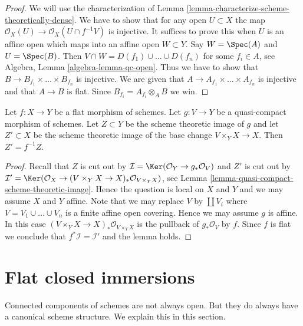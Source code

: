 \begin{proof}
We will use the characterization of
Lemma \ref{lemma-characterize-scheme-theoretically-dense}.
We have to show that for any open $U \subset X$ the map
$\mathcal{O}_X(U) \to \mathcal{O}_X(U \cap f^{-1}V)$ is injective.
It suffices to prove this when $U$ is an affine open which maps into
an affine open $W \subset Y$. Say $W = \Spec(A)$ and $U = \Spec(B)$.
Then $V \cap W = D(f_1) \cup \ldots \cup D(f_n)$ for some
$f_i \in A$, see
Algebra, Lemma \ref{algebra-lemma-qc-open}.
Thus we have to show that
$B \to B_{f_1} \times \ldots \times B_{f_n}$ is injective.
We are given that $A \to A_{f_1} \times \ldots \times A_{f_n}$ is injective
and that $A \to B$ is flat. Since $B_{f_i} = A_{f_i} \otimes_A B$ we win.
\end{proof}

\begin{lemma}
\label{lemma-flat-base-change-scheme-theoretic-image}
Let $f : X \to Y$ be a flat morphism of schemes. Let $g : V \to Y$ be a
quasi-compact morphism of schemes. Let $Z \subset Y$ be the scheme theoretic
image of $g$ and let $Z' \subset X$ be the scheme theoretic image of the
base change $V \times_Y X \to X$. Then $Z' = f^{-1}Z$.
\end{lemma}

\begin{proof}
Recall that $Z$ is cut out by
$\mathcal{I} = \Ker(\mathcal{O}_Y \to g_*\mathcal{O}_V)$
and $Z'$ is cut out by
$\mathcal{I}' = \Ker(\mathcal{O}_X \to
(V \times_Y X \to X)_*\mathcal{O}_{V \times_Y X})$, see
Lemma \ref{lemma-quasi-compact-scheme-theoretic-image}.
Hence the question is local on $X$ and $Y$ and we may assume $X$ and $Y$
affine. Note that we may replace $V$ by $\coprod V_i$ where
$V = V_1 \cup \ldots \cup V_n$ is a finite affine open covering.
Hence we may assume $g$ is affine. In this case
$(V \times_Y X \to X)_*\mathcal{O}_{V \times_Y X}$ is the pullback
of $g_*\mathcal{O}_V$ by $f$. Since $f$ is flat we conclude that
$f^*\mathcal{I} = \mathcal{I}'$ and the lemma holds.
\end{proof}




\section{Flat closed immersions}
\label{section-flat-closed-immersions}

\noindent
Connected components of schemes are not always open. But they do always
have a canonical scheme structure. We explain this in this section.

